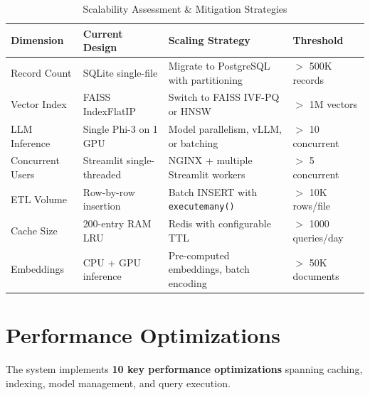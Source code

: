 \documentclass[12pt, a4paper, twoside]{article}
\begin{document}
\begin{table}[H]
\centering
\caption{Scalability Assessment \& Mitigation Strategies}
\label{tab:scalability}
\begin{tabularx}{\textwidth}{L{1.8cm} L{2.5cm} X L{2cm}}
\toprule
{}\color{white}\textbf{Dimension} & \color{white}\textbf{Current Design} & \color{white}\textbf{Scaling Strategy} & \color{white}\textbf{Threshold} \\
\midrule
Record Count & SQLite single-file & Migrate to PostgreSQL with partitioning & $>$ 500K records \\
Vector Index & FAISS IndexFlatIP & Switch to FAISS IVF-PQ or HNSW & $>$ 1M vectors \\
LLM Inference & Single Phi-3 on 1 GPU & Model parallelism, vLLM, or batching & $>$ 10 concurrent \\
Concurrent Users & Streamlit single-threaded & NGINX + multiple Streamlit workers & $>$ 5 concurrent \\
ETL Volume & Row-by-row insertion & Batch INSERT with \texttt{executemany()} & $>$ 10K rows/file \\
Cache Size & 200-entry RAM LRU & Redis with configurable TTL & $>$ 1000 queries/day \\
Embeddings & CPU + GPU inference & Pre-computed embeddings, batch encoding & $>$ 50K documents \\
\bottomrule
\end{tabularx}
\end{table}

\newpage

\section{Performance Optimizations}

The system implements \textbf{10 key performance optimizations} spanning caching, indexing, model management, and query execution.
\end{document}
